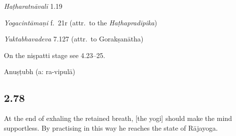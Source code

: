 \begin{ekdosis}
\begin{testimonia}[hp02_077]
\emph{Haṭharatnāvalī} 1.19

\begin{versinnote}
\end{versinnote}

\emph{Yogacintāmaṇi} f.~21r (attr.~to the \emph{Haṭhapradīpika})

\begin{versinnote}
\end{versinnote}

\emph{Yuktabhavadeva} 7.127 (attr.~to Gorakṣanātha)

\begin{versinnote}
\end{versinnote}

\end{testimonia}

\begin{philcomm}[hp02_077]
On the niṣpatti stage see 4.23–25.
\end{philcomm}

\begin{metre}[hp02_077]
Anuṣṭubh (a: ra-vipulā)
\end{metre}

\subsection*{2.78}
\begin{translation}[hp02_078]
At the end of exhaling the retained breath, [the yogi] should make the mind supportless. By practising in this way he reaches the state of Rājayoga.
\end{translation}


\end{ekdosis}
